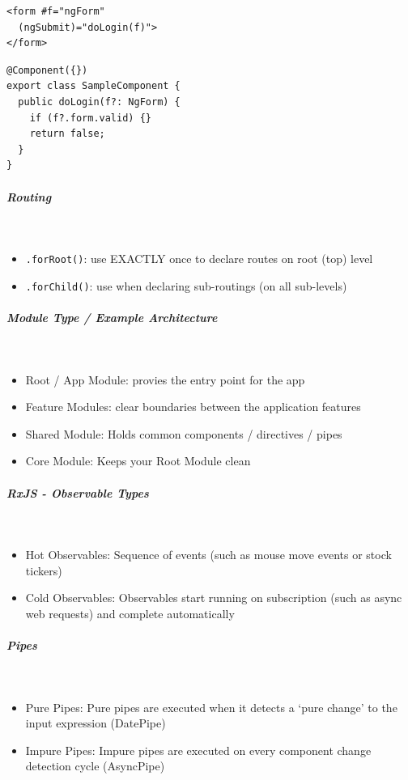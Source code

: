 \documentclass[11pt,twoside,landscape]{article}
\begin{document}
\begin{multicols}{4}
{
\begin{verbatim}
<form #f="ngForm"
  (ngSubmit)="doLogin(f)">
</form>
\end{verbatim}
\label{lst:angular-form-markup}
}

{
\begin{verbatim}
@Component({})
export class SampleComponent {
  public doLogin(f?: NgForm) {
    if (f?.form.valid) {}
    return false;
  }
}
\end{verbatim}
\label{lst:angular-form-logic}
}
\subparagraph{Routing} \
\label{sec:org200c547}
\begin{itemize}
\item \texttt{.forRoot()}: use EXACTLY once to declare routes on root (top) level
\item \texttt{.forChild()}: use when declaring sub-routings (on all sub-levels)
\end{itemize}
\subparagraph{Module Type / Example Architecture} \
\label{sec:orgbe6d0f3}
\begin{itemize}
\item Root / App Module: provies the entry point for the app
\item Feature Modules: clear boundaries between the application features
\item Shared Module: Holds common components / directives / pipes
\item Core Module: Keeps your Root Module clean
\end{itemize}
\subparagraph{RxJS - Observable Types} \
\label{sec:orgc01bd8a}
\begin{itemize}
\item Hot Observables: Sequence of events (such as mouse move events or stock tickers)
\item Cold Observables: Observables start running on subscription (such as async web requests) and complete automatically
\end{itemize}
\subparagraph{Pipes} \
\label{sec:org6e6b7b3}
\begin{itemize}
\item Pure Pipes: Pure pipes are executed when it detects a ‘pure change’ to the input expression (DatePipe)
\item Impure Pipes: Impure pipes are executed on every component change detection cycle (AsyncPipe)
\end{itemize}

\end{multicols}
\end{document}
